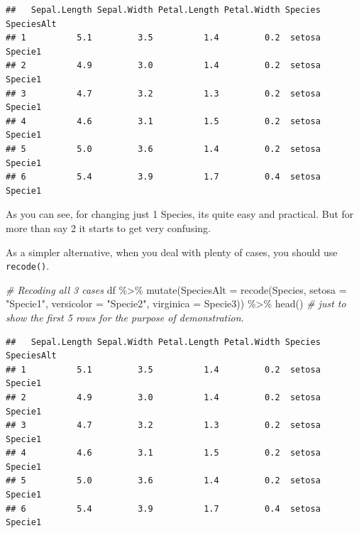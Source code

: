 \documentclass[
]{book}
\newenvironment{Shaded}{\begin{snugshade}}{\end{snugshade}}
\newcommand{\AttributeTok}[1]{\textcolor[rgb]{0.77,0.63,0.00}{#1}}
\newcommand{\CommentTok}[1]{\textcolor[rgb]{0.56,0.35,0.01}{\textit{#1}}}
\newcommand{\FunctionTok}[1]{\textcolor[rgb]{0.00,0.00,0.00}{#1}}
\newcommand{\NormalTok}[1]{#1}
\newcommand{\SpecialCharTok}[1]{\textcolor[rgb]{0.00,0.00,0.00}{#1}}
\newcommand{\StringTok}[1]{\textcolor[rgb]{0.31,0.60,0.02}{#1}}
\begin{document}
\begin{verbatim}
##   Sepal.Length Sepal.Width Petal.Length Petal.Width Species SpeciesAlt
## 1          5.1         3.5          1.4         0.2  setosa    Specie1
## 2          4.9         3.0          1.4         0.2  setosa    Specie1
## 3          4.7         3.2          1.3         0.2  setosa    Specie1
## 4          4.6         3.1          1.5         0.2  setosa    Specie1
## 5          5.0         3.6          1.4         0.2  setosa    Specie1
## 6          5.4         3.9          1.7         0.4  setosa    Specie1
\end{verbatim}

As you can see, for changing just 1 Species, its quite easy and practical.
But for more than say 2 it starts to get very confusing.

As a simpler alternative, when you deal with plenty of cases, you should use \texttt{recode()}.

\begin{Shaded}
\begin{Highlighting}[]
\CommentTok{\# Recoding all 3 cases}
\NormalTok{df }\SpecialCharTok{\%\textgreater{}\%} 
  \FunctionTok{mutate}\NormalTok{(}\AttributeTok{SpeciesAlt =} \FunctionTok{recode}\NormalTok{(Species, }\AttributeTok{setosa =} \StringTok{"Specie1"}\NormalTok{,}
                             \AttributeTok{versicolor =} \StringTok{"Specie2"}\NormalTok{, }
                             \AttributeTok{virginica =} \StringTok{\textquotesingle{}Specie3\textquotesingle{}}\NormalTok{)) }\SpecialCharTok{\%\textgreater{}\%} 
  \FunctionTok{head}\NormalTok{()  }\CommentTok{\# just to show the first 5 rows for the purpose of demonstration.}
\end{Highlighting}
\end{Shaded}

\begin{verbatim}
##   Sepal.Length Sepal.Width Petal.Length Petal.Width Species SpeciesAlt
## 1          5.1         3.5          1.4         0.2  setosa    Specie1
## 2          4.9         3.0          1.4         0.2  setosa    Specie1
## 3          4.7         3.2          1.3         0.2  setosa    Specie1
## 4          4.6         3.1          1.5         0.2  setosa    Specie1
## 5          5.0         3.6          1.4         0.2  setosa    Specie1
## 6          5.4         3.9          1.7         0.4  setosa    Specie1
\end{verbatim}
\end{document}
